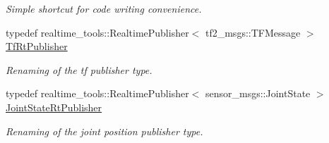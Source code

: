 \begin{DoxyCompactItemize}
\begin{DoxyCompactList}\small\item\em Simple shortcut for code writing convenience. \end{DoxyCompactList}\item 
typedef realtime\+\_\+tools\+::\+Realtime\+Publisher$<$ tf2\+\_\+msgs\+::\+T\+F\+Message $>$ \hyperlink{namespacedynamic__graph_ac8d567b9a3d1ab846ba2efdc1ff1e120}{Tf\+Rt\+Publisher}\hypertarget{namespacedynamic__graph_ac8d567b9a3d1ab846ba2efdc1ff1e120}{}\label{namespacedynamic__graph_ac8d567b9a3d1ab846ba2efdc1ff1e120}

\begin{DoxyCompactList}\small\item\em Renaming of the tf publisher type. \end{DoxyCompactList}\item 
typedef realtime\+\_\+tools\+::\+Realtime\+Publisher$<$ sensor\+\_\+msgs\+::\+Joint\+State $>$ \hyperlink{namespacedynamic__graph_ae9ad83c8174a9aa5bc1688df02b4ee95}{Joint\+State\+Rt\+Publisher}\hypertarget{namespacedynamic__graph_ae9ad83c8174a9aa5bc1688df02b4ee95}{}\label{namespacedynamic__graph_ae9ad83c8174a9aa5bc1688df02b4ee95}

\begin{DoxyCompactList}\small\item\em Renaming of the joint position publisher type. \end{DoxyCompactList}\end{DoxyCompactItemize}
